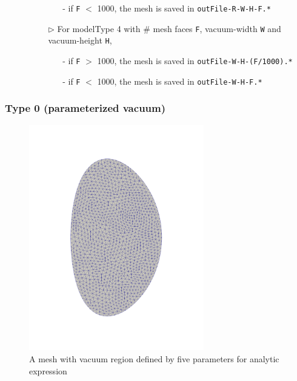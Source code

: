\begin{itemize}
\begin{itemize}
\begin{itemize}
\begin{itemize}
      \item[-] if \texttt{F} $<$ 1000, the mesh is saved in \texttt{outFile-R-W-H-F.*}
      \end{itemize}
    \item[$\triangleright$] For modelType 4 with \# mesh faces \texttt{F}, vacuum-width \texttt{W} and vacuum-height \texttt{H},
      \begin{itemize}
      \item[-] if \texttt{F} $>$ 1000, the mesh is saved in \texttt{outFile-W-H-(F/1000).*}
      \item[-] if \texttt{F} $<$ 1000, the mesh is saved in \texttt{outFile-W-H-F.*}
      \end{itemize}
    \end{itemize}
  \end{itemize}
\end{itemize}

\subsubsection{Type 0 (parameterized vacuum)}

\begin{figure}
\centering
\includegraphics[width=3in]{./figures/meshgen-type0.pdf}
\caption[Mesh with vacuum region defined by five parameters for analytic expression]
{A mesh with vacuum region defined by five parameters for analytic expression}
\label{fig:meshgen-type0}
\end{figure}

